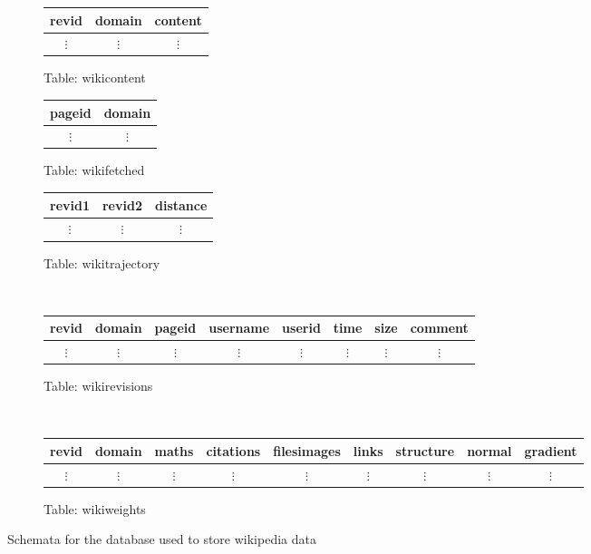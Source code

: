 \begin{figure}
  \label{database-schema}
  \centering
  \begin{subfigure}[b!]{0.3\linewidth}
    \centering
    \caption{Table: wikicontent}
    \begin{tabular}{ccc}
      \toprule
      revid & domain & content\\
      \midrule
      $\vdots$ & $\vdots$ & $\vdots$\\
    \end{tabular}
  \end{subfigure}
  \begin{subfigure}[b!]{0.3\linewidth}
    \centering
    \caption{Table: wikifetched}
    \begin{tabular}{cc}
      \toprule
      pageid & domain \\
      \midrule
      $\vdots$ & $\vdots$\\
    \end{tabular}
  \end{subfigure}
  \begin{subfigure}[b!]{0.3\linewidth}
    \centering
    \caption{Table: wikitrajectory}
    \begin{tabular}{ccc}
      \toprule
      revid1 & revid2 & distance\\
      \midrule
      $\vdots$ & $\vdots$ & $\vdots$ \\
    \end{tabular}
  \end{subfigure}\\
  \vspace{10 mm}
  \begin{subfigure}[b!]{\linewidth}
    \centering
    \caption{Table: wikirevisions}
    \begin{tabular}{cccccccc}
      \toprule
      revid & domain & pageid & username & userid & time & size &
      comment \\ 
      \midrule
      $\vdots$ & $\vdots$ & $\vdots$ & $\vdots$ & $\vdots$ & $\vdots$
      & $\vdots$ & $\vdots$ \\
    \end{tabular}
  \end{subfigure}\\

  \begin{subfigure}[b!]{\linewidth}
    \centering
    \caption{Table: wikiweights} 
    \begin{tabular}{ccccccccc}
      \toprule
      revid & domain & maths & citations & filesimages & links &
      structure & normal & gradient\\
      \midrule
      $\vdots$ & $\vdots$ & $\vdots$ & $\vdots$ & $\vdots$ & $\vdots$ &
      $\vdots$ & $\vdots$ & $\vdots$ \\
    \end{tabular}
  \end{subfigure}
  \caption{Schemata for the database used to store wikipedia data}
\end{figure}
